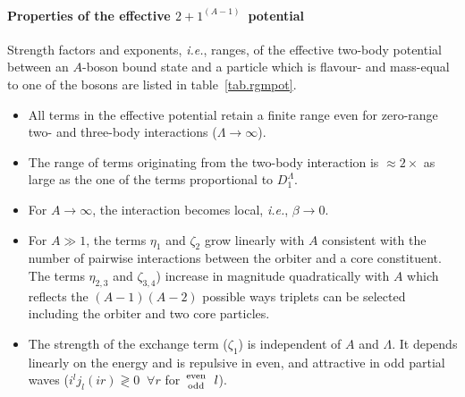 \documentclass
[aps,nofootinbib,prl,showpacs,twocolumn,groupedaddress,superscriptaddress]
{revtex4}
\newcommand*{\mprime}{^{\prime}\mkern-1.2mu}
\newcommand*{\mdprime}{^{\prime\prime}\mkern-1.2mu}
\newcommand{\ie}{\textit{i.e.}\;}
\newcommand{\abb}{\ensuremath{2\!+\!1^{(A-1)}}}
\newcommand{\tabref}[1]{table~\ref{#1}}
\begin{document}
\paragraph*{Properties of the effective \abb~potential}
Strength factors and exponents, \ie, ranges, of the effective two-body potential between an
$A$-boson bound state and a particle which is flavour- and mass-equal to one of the bosons are
listed in \tabref{tab.rgmpot}.
\begin{itemize}
\item All terms in the effective potential retain a finite range even for zero-range two- and three-body
interactions ($\Lambda\to\infty$).
\item The range of terms originating from the two-body interaction is $\approx 2\times$ as large as the one
of the terms proportional to $D_1^\Lambda$.
\item For $A\to\infty$, the interaction becomes local, \ie, $\beta\to0$.
\item For $A\gg1$, the terms $\eta_1$ and $\zeta_2$ grow linearly with $A$ consistent with the number
of pairwise interactions between the orbiter and a core constituent. The terms
$\eta_{2,3}$ and $\zeta_{3,4}$) increase in magnitude quadratically with $A$ which reflects the $(A-1)(A-2)$
possible ways triplets can be selected including the orbiter and two core particles.
\item The strength of the exchange term ($\zeta_1$) is independent of $A$ and $\Lambda$. It depends linearly
on the energy and is repulsive in even, and attractive in odd partial waves ($i^lj_l(ir)\gtrless0\;\;\forall r$ for ${\text{even}\atop\text{odd}}\;\;l$).
\end{itemize}

% 
%
\newpage
\end{document}
